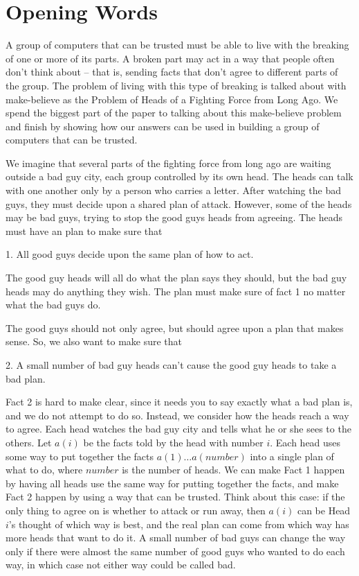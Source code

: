 \documentclass{article}
\begin{document}
\section{Opening Words}

A group of computers that can be trusted must be able to live with the breaking of one or more of its parts.
A broken part may act in a way that people often don't think about -- that is, sending facts that don't agree to different parts of the group.
The problem of living with this type of breaking is talked about with make-believe as the Problem of Heads of a Fighting Force from Long Ago. We spend the biggest part of the paper to talking about this make-believe problem and finish by showing how our answers can be used in building a group of computers that can be trusted.

We imagine that several parts of the fighting force from long ago are waiting outside a bad guy city, each group controlled by its own head.
The heads can talk with one another only by a person who carries a letter.
After watching the bad guys, they must decide upon a shared plan of attack.
However, some of the heads may be bad guys, trying to stop the good guys heads from agreeing. The heads must have an plan to make sure that

1. All good guys decide upon the same plan of how to act.

The good guy heads will all do what the plan says they should, but the bad guy heads may do anything they wish. The plan must make sure of fact 1 no matter what the bad guys do.

The good guys should not only agree, but should agree upon a plan that makes sense. So, we also want to make sure that

2. A small number of bad guy heads can't cause the good guy heads to take a bad plan.

Fact 2 is hard to make clear, since it needs you to say exactly what a bad plan is, and we do not attempt to do so. Instead, we consider how the heads reach a way to agree. Each head watches the bad guy city and tells what he or she sees to the others. Let $a(i)$ be the facts told by the head with number $i$. Each head uses some way to put together the facts $a(1) \dots a(number)$ into a single plan of what to do, where $number$ is the number of heads. We can make Fact 1 happen by having all heads use the same way for putting together the facts, and make Fact 2 happen by using a way that can be trusted. Think about this case: if the only thing to agree on is whether to attack or run away, then $a(i)$ can be Head $i$'s thought of which way is best, and the real plan can come from which way has more heads that want to do it. A small number of bad guys can change the way only if there were almost the same number of good guys who wanted to do each way, in which case not either way could be called bad.
\end{document}
